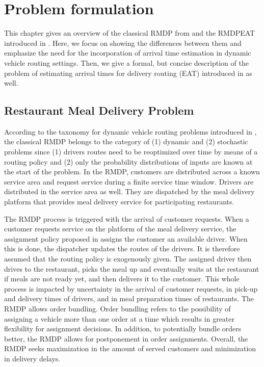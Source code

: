 \chapter{Problem formulation}\label{chap:prob}

This chapter gives an overview of the classical RMDP from \cite{UlmerRMDP} and the RMDPEAT introduced in \cite{Hildebrandt2020_EAT}. Here, we focus on showing the differences between them and emphasize the need for the incorporation of arrival time estimation in dynamic vehicle routing settings. Then, we give a formal, but concise description of the problem of estimating arrival times for delivery routing (EAT) introduced in \cite{Hildebrandt2020_EAT} as well. 
\section{Restaurant Meal Delivery Problem}

According to the taxonomy for dynamic vehicle routing problems introduced in \cite{psaraftis}, the classical RMDP belongs to the category of (1) dynamic and (2) stochastic problems since (1) drivers routes need to be reoptimized over time by means of a routing policy and (2) only the probability distributions of inputs are known at the start of the problem. In the RMDP, customers are distributed across a known service area and request service during a finite service time window. Drivers are distributed in the service area as well. They are dispatched by the meal delivery platform that provides meal delivery service for participating restaurants. 

The RMDP process is triggered with the arrival of customer requests. When a customer requests service on the platform of the meal delivery service, the assignment policy proposed in \cite{UlmerRMDP} assigns the customer an available driver. When this is done, the dispatcher updates the routes of the drivers. It is therefore assumed that the routing policy is exogenously given. The assigned driver then drives to the restaurant, picks the meal up and eventually waits at the restaurant if meals are not ready yet, and then delivers it to the customer. This whole process is impacted by uncertainty in the arrival of customer requests, in pick-up and delivery times of drivers, and in meal preparation times of restaurants.
The RMDP allows order bundling. Order bundling refers to the possibility of assigning a vehicle more than one order at a time which results in greater flexibility for assignment decisions. In addition, to potentially bundle orders better, the RMDP allows for postponement in order assignments.
Overall, the RMDP seeks maximization in the amount of served customers and minimization in delivery delays. 

